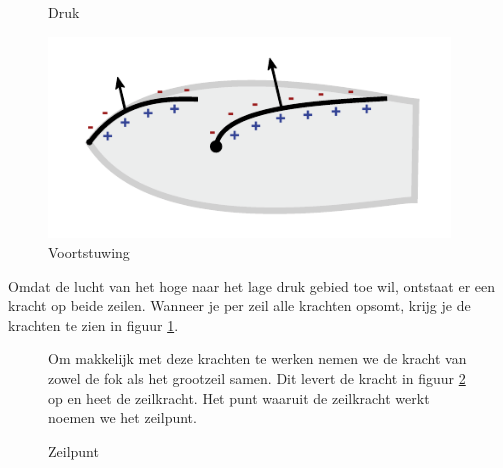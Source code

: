 \begin{figure}[H]
\begin{minipage}[b]{0.32\textwidth}
		\caption{Druk}
		\label{pic:druk}
	\end{minipage}
	\hfill
	\begin{minipage}[b]{0.32\textwidth}
		\centering
		\includegraphics[width=0.95\textwidth]{Hoofdstukken/Krachten/pdf/voortstuwing_zeil_krachten_los.pdf}
		\caption{Voortstuwing}
		\label{pic:stuwing}
	\end{minipage}
\end{figure}

Omdat de lucht van het hoge naar het lage druk gebied toe wil, ontstaat er een kracht op beide zeilen. Wanneer je per zeil alle krachten opsomt, krijg je de krachten te zien in figuur \ref{pic:stuwing}.

\begin{figure}[H]
	\centering
	\begin{minipage}[t]{0.63\textwidth}
		\vspace*{0.2cm}
		Om makkelijk met deze krachten te werken nemen we de kracht van zowel de fok als het grootzeil samen. Dit levert de kracht in figuur \ref{pic:zeilpunt} op en heet de zeilkracht. Het punt waaruit de zeilkracht werkt noemen we het zeilpunt. 
	\end{minipage}
	\hfill
	\begin{minipage}[t]{0.32\textwidth}
		\RemoveLine
		\caption{Zeilpunt}
		\label{pic:zeilpunt}
	\end{minipage}
\end{figure} 


